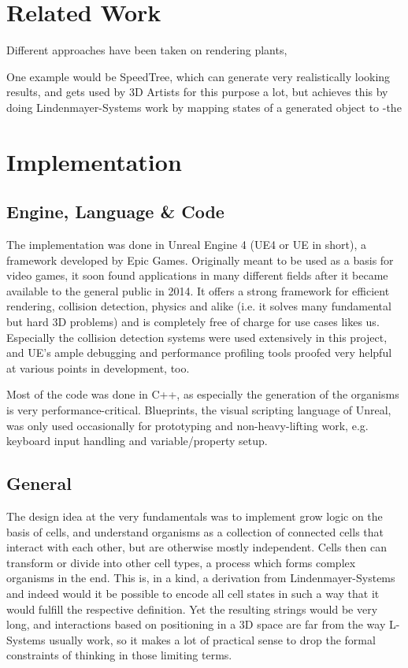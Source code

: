 \documentclass[11pt]{scrartcl}
\begin{document}
\section{Related Work}
Different approaches have been taken on rendering plants, 

One example would be SpeedTree, which can generate very realistically looking results, and gets used by 3D Artists for this purpose a lot, but achieves this by doing 
Lindenmayer-Systems work by mapping states of a generated object to 
-the 


\section{Implementation}
\subsection{Engine, Language \& Code}
The implementation was done in Unreal Engine 4 (UE4 or UE in short), a framework developed by Epic Games. Originally meant to be used as a basis for video games, it soon found applications in many different fields after it became available to the general public in 2014. It offers a strong framework for efficient rendering, collision detection, physics and alike (i.e. it solves many fundamental but hard 3D problems) and is completely free of charge for use cases likes us. Especially the collision detection systems were used extensively in this project, and UE's ample debugging and performance profiling tools proofed very helpful at various points in development, too. 

Most of the code was done in C++, as especially the generation of the organisms is very performance-critical. Blueprints, the visual scripting language of Unreal, was only used occasionally for prototyping and non-heavy-lifting work, e.g. keyboard input handling and variable/property setup.

\subsection{General}
The design idea at the very fundamentals was to implement grow logic on the basis of cells, and understand organisms as a collection of connected cells that interact with each other, but are otherwise mostly independent. Cells then can transform or divide into other cell types, a process which forms complex organisms in the end. This is, in a kind, a derivation from Lindenmayer-Systems and indeed would it be possible to encode all cell states in such a way that it would fulfill the respective definition. Yet the resulting strings would be very long, and interactions based on positioning in a 3D space are far from the way L-Systems usually work, so it makes a lot of practical sense to drop the formal constraints of thinking in those limiting terms. 
\end{document}
